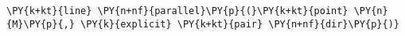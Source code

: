 \begin{Verbatim}[commandchars=\\\{\}]
    \PY{k+kt}{line} \PY{n+nf}{parallel}\PY{p}{(}\PY{k+kt}{point} \PY{n}{M}\PY{p}{,} \PY{k}{explicit} \PY{k+kt}{pair} \PY{n+nf}{dir}\PY{p}{)}
\end{Verbatim}
